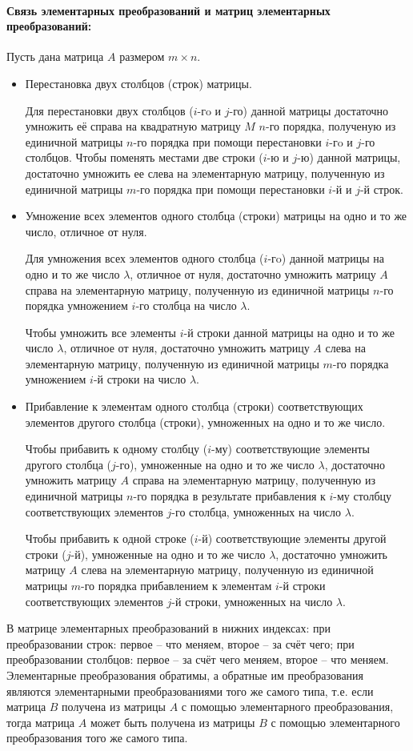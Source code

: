 \documentclass[a4paper,14pt]{article}
\begin{document}
\paragraph{Связь элементарных преобразований и матриц элементарных преобразований:}
Пусть дана матрица $A$ размером $m \times n$.
\begin{itemize}
	\item Перестановка двух столбцов (строк) матрицы.
	
	Для перестановки двух столбцов ($i$-гo и $j$-го) данной матрицы достаточно умножить её справа на квадратную матрицу $M$ $n$-го порядка, полученую из единичной матрицы $n$-го порядка при помощи перестановки $i$-гo и $j$-го столбцов. Чтобы поменять местами две строки ($i$-ю и $j$-ю) данной матрицы, достаточно умножить ее слева на элементарную матрицу, полученную из единичной матрицы $m$-го порядка при помощи перестановки $i$-й и $j$-й строк.
	\item Умножение всех элементов одного столбца (строки) матрицы на одно и то же число, отличное от нуля.
	
	Для умножения всех элементов одного столбца ($i$-гo) данной матрицы на одно и то же число $\lambda$, отличное от нуля, достаточно умножить матрицу $A$ справа на элементарную матрицу, полученную из единичной матрицы $n$-го порядка умножением $i$-го столбца на число $\lambda$.
	
	Чтобы умножить все элементы $i$-й строки данной матрицы на одно и то же число $\lambda$, отличное от нуля, достаточно умножить матрицу $A$ слева на элементарную матрицу, полученную из единичной матрицы $m$-го порядка умножением $i$-й строки на число $\lambda$.
	\item Прибавление к элементам одного столбца (строки) соответствующих элементов другого столбца (строки), умноженных на одно и то же число.
	
	Чтобы прибавить к одному столбцу ($i$-му) соответствующие элементы другого столбца ($j$-го), умноженные на одно и то же число $\lambda$, достаточно умножить матрицу $A$ справа на элементарную матрицу, полученную из единичной матрицы $n$-го порядка в результате прибавления к $i$-му столбцу соответствующих элементов $j$-го столбца, умноженных на число $\lambda$.
	
	Чтобы прибавить к одной строке ($i$-й) соответствующие элементы другой строки ($j$-й), умноженные на одно и то же число $\lambda$, достаточно умножить матрицу $A$ слева на элементарную матрицу, полученную из единичной матрицы $m$-го порядка прибавлением к элементам $i$-й строки соответствующих элементов $j$-й строки, умноженных на число $\lambda$.
\end{itemize}
В матрице элементарных преобразований в нижних индексах: при преобразовании строк: первое – что меняем, второе – за счёт чего; при преобразовании столбцов: первое – за счёт чего меняем, второе – что меняем.
Элементарные преобразования обратимы, а обратные им преобразования являются элементарными преобразованиями того же самого типа, т.е. если матрица $B$ получена из матрицы $A$ с помощью элементарного преобразования, тогда матрица $A$ может быть получена из матрицы $B$ с помощью элементарного преобразования того же самого типа.
\end{document}
